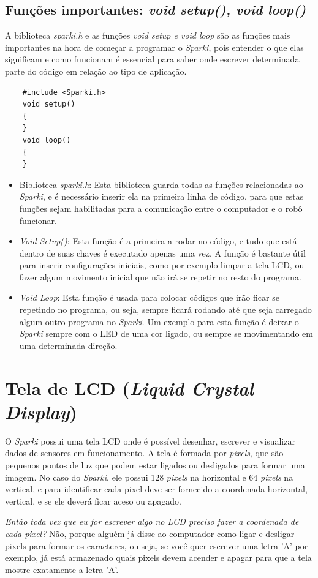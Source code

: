  
\subsection{Funções importantes: \textit{void setup(), void loop()}}
    
    A biblioteca  \textit{sparki.h} e as funções \textit{void setup e void loop} são as funções mais importantes na hora de começar a programar o \textit{Sparki}, pois entender o que elas significam e como funcionam é essencial para saber onde escrever determinada parte do código em relação ao tipo de aplicação.
    
    \begin{verbatim}
    #include <Sparki.h>
    void setup()
    {
    }
    void loop()
    {
    }
    \end{verbatim}

    \begin{itemize}
        \item Biblioteca \textit{sparki.h}: Esta biblioteca guarda todas as funções relacionadas ao \textit{Sparki}, e é necessário inserir ela na primeira linha de código, para que estas funções sejam habilitadas para a comunicação entre o computador e o robô funcionar.
        \item \textit{Void Setup()}: Esta função é a primeira a rodar no código, e tudo que está dentro de suas chaves é executado apenas uma vez. A função é bastante útil para inserir configurações iniciais, como por exemplo limpar a tela LCD, ou fazer algum movimento inicial que não irá se repetir no resto do programa.
        \item \textit{Void Loop}: Esta função é usada para colocar códigos que irão ficar se repetindo no programa, ou seja, sempre ficará rodando até que seja carregado algum outro programa no \textit{Sparki}. Um exemplo para esta função é deixar o \textit{Sparki} sempre com o LED de uma cor ligado, ou sempre se movimentando em uma determinada direção.
        \end{itemize}
    

\section{Tela de LCD (\textit{Liquid Crystal Display})}
O \textit{Sparki} possui uma tela LCD onde é possível desenhar, escrever e visualizar dados de sensores em funcionamento. A tela é formada por \textit{pixels}, que são pequenos pontos de luz que podem estar ligados ou desligados para formar uma imagem. No caso do \textit{Sparki}, ele possui 128 \textit{pixels} na horizontal e 64 \textit{pixels} na vertical, e para identificar cada pixel deve ser fornecido a coordenada horizontal, vertical, e se ele deverá ficar aceso ou apagado. \par
\textit{Então toda vez que eu for escrever algo no LCD preciso fazer a coordenada de cada pixel?}
Não, porque alguém já disse ao computador como ligar e desligar pixels para formar os caracteres, ou seja, se você quer escrever uma letra 'A' por exemplo, já está armazenado quais pixels devem acender e apagar para que a tela mostre exatamente a letra 'A'.

